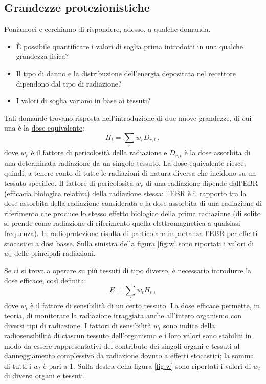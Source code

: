 \documentclass{report}
\newcommand{\figref}[1]{figura \ref{#1}}
\numberwithin{equation}{section}
\numberwithin{figure}{section}
\begin{document}
\subsection{Grandezze protezionistiche}
Poniamoci e cerchiamo di rispondere, adesso, a qualche domanda.
\begin{itemize}[label=$-$]
    \item È possibile quantificare i valori di soglia prima introdotti in una qualche grandezza fisica?
    \item Il tipo di danno e la distribuzione dell'energia depositata nel recettore dipendono dal tipo di radiazione?
    \item I valori di soglia variano in base ai tessuti?
\end{itemize}
Tali domande trovano risposta nell'introduzione di due nuove grandezze, di cui una è la \underline{dose equivalente}:
\begin{equation}
    H_t = \sum_r w_r D_{r,t}\,,
\end{equation}
dove $w_r$ è il fattore di pericolosità della radiazione e $D_{r,t}$ è la dose assorbita di una determinata radiazione da un singolo tessuto. La dose equivalente riesce, quindi, a tenere conto di tutte le radiazioni di natura diversa che incidono su un tessuto specifico. Il fattore di pericolosità $w_r$ di una radiazione dipende dall'EBR (efficacia biologica relativa) della radiazione stessa: l'EBR è il rapporto tra la dose assorbita della radiazione considerata e la dose assorbita di una radiazione di riferimento che produce lo stesso effetto biologico della prima radiazione (di solito si prende come radiazione di riferimento quella elettromagnetica a qualsiasi frequenza). In radioprotezione risulta di particolare importanza l'EBR per effetti stocastici a dosi basse. Sulla sinistra della \figref{fig:w} sono riportati i valori di $w_r$ delle principali radiazioni.

Se ci si trova a operare su più tessuti di tipo diverso, è necessario introdurre la \underline{dose efficace}, così definita:
\begin{equation}
    E = \sum_t w_t H_t\,,
\end{equation}
dove $w_t$ è il fattore di sensibilità di un certo tessuto. La dose efficace permette, in teoria, di monitorare la radiazione irraggiata anche all'intero organismo con diversi tipi di radiazione. I fattori di sensibilità $w_t$ sono indice della radiosensibilità di ciascun tessuto dell'organismo e i loro valori sono stabiliti in modo da essere rappresentativi del contributo dei singoli organi e tessuti al danneggiamento complessivo da radiazione dovuto a effetti stocastici; la somma di tutti i $w_t$ è pari a 1. Sulla destra della \figref{fig:w} sono riportati i valori di $w_t$ di diversi organi e tessuti.
\end{document}
